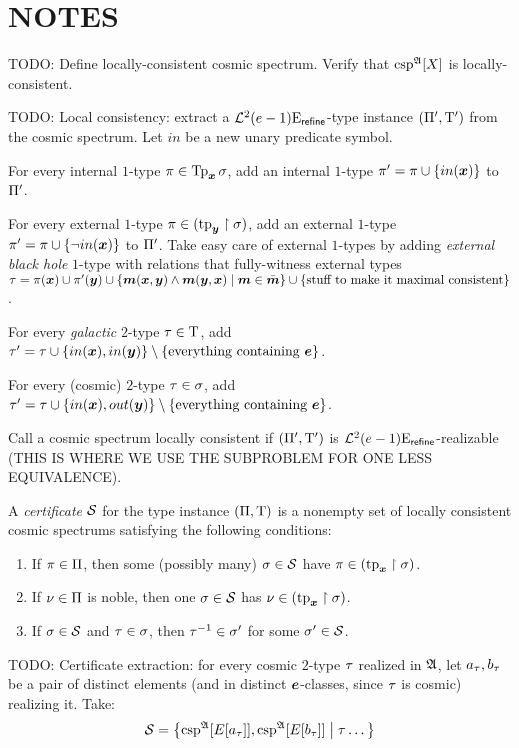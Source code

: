 \section{NOTES}
 TODO: Define locally-consistent cosmic spectrum. Verify
that $\operatorname{csp}^{\mathfrak{A}}[X]$ is locally-consistent.

TODO: Local consistency: extract a $\mathcal{L}^{2}_{{}}{(e-1)}\mathrm{E}_{\mathsf{refine}}$-type
instance $(\Pi', \mathrm{T}')$ from the cosmic spectrum. Let $in$ be a new unary
predicate symbol.

For every internal $1$-type $\pi \in \operatorname{Tp}_{\bm{x}}\sigma$, add an internal $1$-type
$\pi' = \pi \cup \left\{in(\bm{x})\right\}$ to $\Pi'$.

For every external $1$-type $\pi \in(\operatorname{tp}_{\bm{y}}\restriction\sigma)$, add an external
$1$-type $\pi' = \pi \cup \left\{\lnot in(\bm{x})\right\}$ to $\Pi'$.
Take easy care of external $1$-types by adding \emph{external black hole}
$1$-type with relations that fully-witness external types $\tau =
\pi(\bm{x}) \cup \pi'(\bm{y}) \cup \left\{\bm{m}(\bm{x},\bm{y}) \land \bm{m}(\bm{y},\bm{x})\mathrel{}\middle|\mathrel{}\bm{m} \in \bar{\bm{m}}\right\} \cup \left\{\text{stuff to make it maximal
consistent}\right\}$.

For every \emph{galactic} $2$-type $\tau \in \mathrm{T}$, add
$\tau' = \tau \cup \left\{in(\bm{x}), in(\bm{y})\right\} \setminus 
\left\{\text{everything containing }\bm{e}\right\}$.

For every (cosmic) $2$-type $\tau \in \sigma$, add
$\tau' = \tau \cup \left\{in(\bm{x}),out(\bm{y})\right\} \setminus \left\{\text{everything
containing }\bm{e}\right\}$.

Call a cosmic spectrum locally consistent if $(\Pi', \mathrm{T}')$ is
$\mathcal{L}^{2}_{{}}{(e-1)}\mathrm{E}_{\mathsf{refine}}$-realizable (THIS IS WHERE WE USE THE
SUBPROBLEM FOR ONE LESS EQUIVALENCE).

\begin{definition}
A \emph{certificate} $\mathcal{S}$ for the type instance $(\Pi,\mathrm{T})$ is a
nonempty set of locally consistent cosmic spectrums satisfying the following
conditions:
\begin{enumerate}
  \item If $\pi \in \Pi$, then some (possibly many) $\sigma \in \mathcal{S}$ have
  $\pi \in (\operatorname{tp}_{\bm{x}}\restriction \sigma)$.
  \item If $\nu \in \Pi$ is noble, then one $\sigma \in \mathcal{S}$ has 
  $\nu \in (\operatorname{tp}_{\bm{x}}\restriction \sigma)$.
  \item If $\sigma \in \mathcal{S}$ and $\tau \in \sigma$,
  then $\tau^{-1} \in \sigma'$ for some $\sigma' \in \mathcal{S}$.
\end{enumerate}
\end{definition}

TODO: Certificate extraction: for every cosmic $2$-type $\tau$ realized in
$\mathfrak{A}$, let $a_\tau, b_\tau$ be a pair of distinct elements (and in
distinct $\bm{e}$-classes, since $\tau$ is cosmic) realizing it. Take:
\[
  \mathcal{S} = \left\{\operatorname{csp}^{\mathfrak{A}}[E[a_\tau]], \operatorname{csp}^{\mathfrak{A}}[E[b_\tau]]\mathrel{}\middle|\mathrel{}\tau
  \dots\right\}
\]